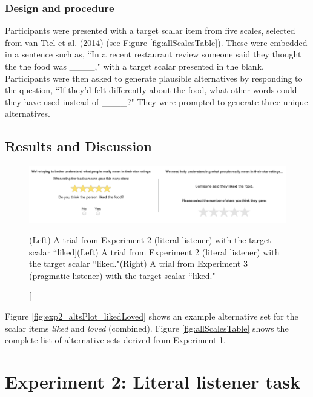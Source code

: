 \documentclass[10pt, letterpaper]{article}
\newenvironment{CodeChunk}{}{}
\begin{document}
\subsubsection{Design and procedure}\label{design-and-procedure}

Participants were presented with a target scalar item from five scales,
selected from {van Tiel} et al. (2014) (see Figure
\ref{fig:allScalesTable}). These were embedded in a sentence such as,
``In a recent restaurant review someone said they thought the the food
was \_\_\_\_," with a target scalar presented in the blank. Participants
were then asked to generate plausible alternatives by responding to the
question, ``If they'd felt differently about the food, what other words
could they have used instead of \_\_\_\_?" They were prompted to
generate three unique alternatives.

\subsection{Results and Discussion}\label{results-and-discussion}

\begin{CodeChunk}
\begin{figure}[t]

{\centering \includegraphics{figs/stimuli_exp1-1} 

}

\caption[(Left) A trial from Experiment 2 (literal listener) with the target scalar ``liked]{(Left) A trial from Experiment 2 (literal listener) with the target scalar ``liked."(Right) A trial from Experiment 3 (pragmatic listener) with the target scalar ``liked."}\label{fig:stimuli_exp1}
\end{figure}
\end{CodeChunk}

Figure \ref{fig:exp2_altsPlot_likedLoved} shows an example alternative
set for the scalar items \emph{liked} and \emph{loved} (combined).
Figure \ref{fig:allScalesTable} shows the complete list of alternative
sets derived from Experiment 1.

\section{Experiment 2: Literal listener
task}\label{experiment-2-literal-listener-task}
\end{document}
